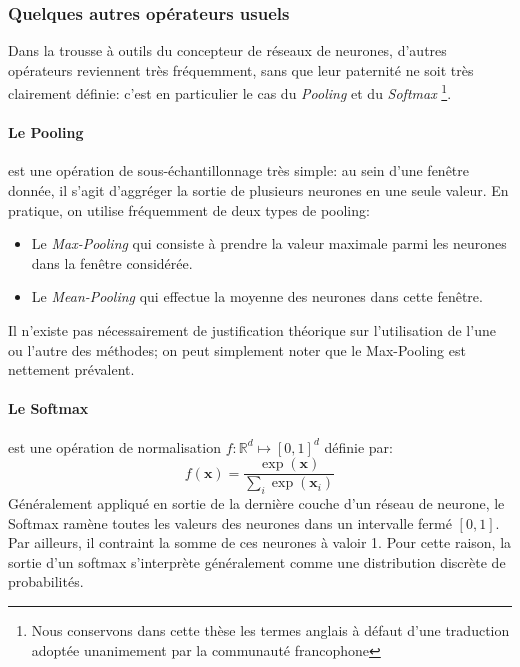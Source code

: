 \subsubsection{Quelques autres opérateurs usuels}
Dans la trousse à outils du concepteur de réseaux de neurones, d'autres opérateurs reviennent très fréquemment, sans que leur paternité ne soit très clairement définie: c'est en particulier le cas du \textit{Pooling} et du \textit{Softmax} \footnote{Nous conservons dans cette thèse les termes anglais à défaut d'une traduction adoptée unanimement par la communauté francophone}.

\paragraph{Le Pooling}est une opération de sous-échantillonnage très simple: au sein d'une fenêtre donnée, il s'agit d'aggréger la sortie de plusieurs neurones en une seule valeur. En pratique, on utilise fréquemment de deux types de pooling:
\begin{itemize}
	\item Le \textit{Max-Pooling} qui consiste à prendre la valeur maximale parmi les neurones dans la fenêtre considérée.
	\item Le \textit{Mean-Pooling} qui effectue la moyenne des neurones dans cette fenêtre.
\end{itemize}
Il n'existe pas nécessairement de justification théorique sur l'utilisation de l'une ou l'autre des méthodes; on peut simplement noter que le Max-Pooling est nettement prévalent.
\paragraph{Le Softmax} est une opération de normalisation $f: \mathbb{R}^d  \mapsto \left[0, 1 \right]^d$ définie par:
\begin{equation}
	f(\mathbf{x}) = \frac{\exp(\mathbf{x})}{\sum_i \exp(\mathbf{x}_i)}
\end{equation}
Généralement appliqué en sortie de la dernière couche d'un réseau de neurone, le Softmax ramène toutes les valeurs des neurones dans un intervalle fermé $\left[0, 1 \right]$. Par ailleurs, il contraint la somme de ces neurones à valoir 1. Pour cette raison, la sortie d'un softmax s'interprète généralement comme une distribution discrète de probabilités.


